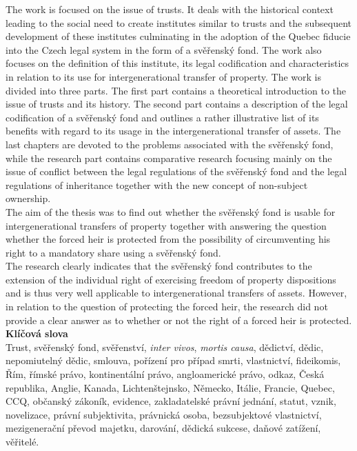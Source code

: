 \documentclass{article}
\begin{document}
\begin{center}
			The work is focused on the issue of trusts. It deals with the historical context leading to the social need to create institutes similar to trusts and the subsequent development of these institutes culminating in the adoption of the Quebec fiducie into the Czech legal system in the form of a svěřenský fond. The work also focuses on the definition of this institute, its legal codification and characteristics in relation to its use for intergenerational transfer of property. The work is divided into three parts. The first part contains a theoretical introduction to the issue of trusts and its history. The second part contains a description of the legal codification of a svěřenský fond and outlines a rather illustrative list of its benefits with regard to its usage in the intergenerational transfer of assets. The last chapters are devoted to the problems associated with the svěřenský fond, while the research part contains comparative research focusing mainly on the issue of conflict between the legal regulations of the svěřenský fond and the legal regulations of inheritance together with the new concept of non-subject ownership.\\
			\vspace*{5mm}
			The aim of the thesis was to find out whether the svěřenský fond is usable for intergenerational transfers of property together with answering the question whether the forced heir is protected from the possibility of circumventing his right to a mandatory share using a svěřenský fond.\\
			\vspace*{5mm}
			The research clearly indicates that the svěřenský fond contributes to the extension of the individual right of exercising freedom of property dispositions and is thus very well applicable to intergenerational transfers of assets. However, in relation to the question of protecting the forced heir, the research did not provide a clear answer as to whether or not the right of a forced heir is protected.\\
		\vspace*{10mm}
		\textbf{\Large Klíčová slova}\\
			\vspace*{5mm}
			Trust, svěřenský fond, svěřenství, \textit{inter vivos}, \textit{mortis causa}, dědictví, dědic, nepomiutelný dědic, smlouva, pořízení pro případ smrti, vlastnictví, fideikomis, Řím, římské právo, kontinentální právo, angloamerické právo, odkaz, Česká republika, Anglie, Kanada, Lichtenštejnsko, Německo, Itálie, Francie, Quebec, CCQ, občanský zákoník, evidence, zakladatelské právní jednání, statut, vznik, novelizace, právní subjektivita, právnická osoba, bezsubjektové vlastnictví, mezigenerační převod majetku, darování, dědická sukcese, daňové zatížení, věřitelé.
	\end{center}
\end{document}
